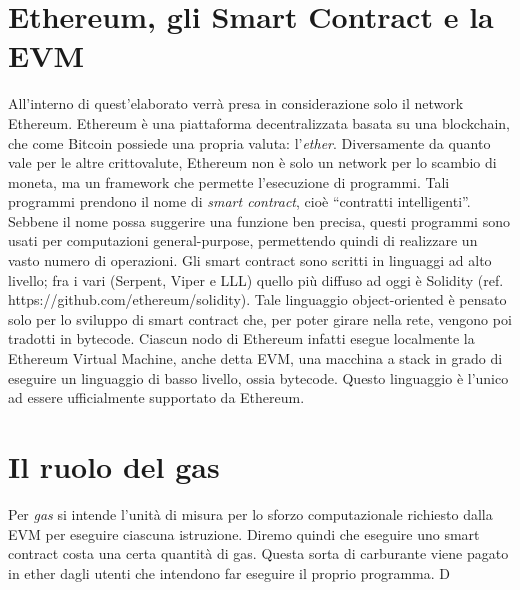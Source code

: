 \section{Ethereum, gli Smart Contract e la EVM}

All'interno di quest'elaborato verrà presa in considerazione solo il network Ethereum.\newline
Ethereum è una piattaforma decentralizzata basata su una blockchain, che come Bitcoin possiede una propria valuta: l'\textit{ether}.\newline 
Diversamente da quanto vale per le altre crittovalute, Ethereum non è solo un network per lo scambio di moneta, ma un framework che permette l'esecuzione di programmi. Tali programmi prendono il nome di \textit{smart contract}, cioè ``contratti intelligenti''. Sebbene il nome possa suggerire una funzione ben precisa, questi programmi sono usati per computazioni general-purpose, permettendo quindi di realizzare un vasto numero di operazioni.\newline
Gli smart contract sono scritti in linguaggi ad alto livello; fra i vari (Serpent, Viper e LLL) quello più diffuso ad oggi è Solidity (ref. https://github.com/ethereum/solidity). 
Tale linguaggio object-oriented è pensato solo per lo sviluppo di smart contract che, per poter girare nella rete, vengono poi tradotti in bytecode. Ciascun nodo di Ethereum infatti esegue localmente la Ethereum Virtual Machine, anche detta EVM, una macchina a stack in grado di eseguire un linguaggio di basso livello, ossia bytecode. Questo linguaggio è l'unico ad essere ufficialmente supportato da Ethereum.\newline 

\section{Il ruolo del gas}

Per \textit{gas} si intende l'unità di misura per lo sforzo computazionale richiesto dalla EVM per eseguire ciascuna istruzione. Diremo quindi che eseguire uno smart contract costa una certa quantità di gas.\newline
Questa sorta di carburante  viene pagato in ether dagli utenti che intendono far eseguire il proprio programma. D



